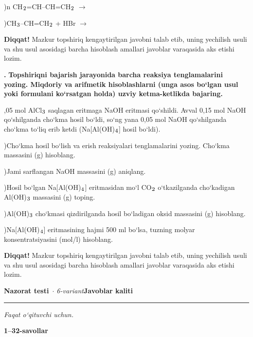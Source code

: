 \documentclass[11pt,a4paper]{article}
\renewcommand{\textsubscript}[1]{\ensuremath{_{\text{\fontsize{8}{8}\selectfont #1}}}}
\newcommand{\qn}[1]{\textbf{\fontsize{11.5}{13}\selectfont #1}}
\newcommand{\qsep}{\par\vspace{1pt}\noindent\rule{0pt}{0.4pt}\par\vspace{5pt}}
\newcommand{\diqqat}[1]{\par\smallskip\noindent\textbf{Diqqat!} #1\par\medskip}
\begin{document}
)n CH\textsubscript{2}=CH--CH=CH\textsubscript{2} $\to$\par
{})CH\textsubscript{3}--CH=CH\textsubscript{2} + HBr $\to$\par
\diqqat{Mazkur topshiriq kengaytirilgan javobni talab etib, uning yechilish usuli va shu usul asosidagi barcha hisoblash amallari javoblar varaqasida aks etishi lozim.}\qsep
\noindent\qn{43.} \textbf{Topshiriqni bajarish jarayonida barcha reaksiya tenglamalarini yozing. Miqdoriy va arifmetik hisoblashlarni (unga asos bo`lgan usul yoki formulani ko`rsatgan holda) uzviy ketma-ketlikda bajaring.}\par{},05 mol AlCl\textsubscript{3} saqlagan eritmaga NaOH eritmasi qo`shildi. Avval 0,15 mol NaOH qo`shilganda cho`kma hosil bo`ldi, so`ng yana 0,05 mol NaOH qo`shilganda cho`kma to`liq erib ketdi (Na[Al(OH)\textsubscript{4}] hosil bo`ldi).\par
{})Cho`kma hosil bo`lish va erish reaksiyalari tenglamalarini yozing. Cho`kma massasini (g) hisoblang.\par
{})Jami sarflangan NaOH massasini (g) aniqlang.\par
{})Hosil bo`lgan Na[Al(OH)\textsubscript{4}] eritmasidan mo`l CO\textsubscript{2} o`tkazilganda cho`kadigan Al(OH)\textsubscript{3} massasini (g) toping.\par
{})Al(OH)\textsubscript{3} cho`kmasi qizdirilganda hosil bo`ladigan oksid massasini (g) hisoblang.\par
{})Na[Al(OH)\textsubscript{4}] eritmasining hajmi 500 ml bo`lsa, tuzning molyar konsentratsiyasini (mol/l) hisoblang.\par
\diqqat{Mazkur topshiriq kengaytirilgan javobni talab etib, uning yechilish usuli va shu usul asosidagi barcha hisoblash amallari javoblar varaqasida aks etishi lozim.}\qsep
\newpage
\noindent\textbf{\fontsize{13}{15}\selectfont Nazorat testi}\ \textit{$\cdot$ 6-variant}\hfill \textbf{Javoblar kaliti}\par\smallskip\hrule\smallskip
\textit{Faqat o`qituvchi uchun.}\par\medskip
\noindent\textbf{1--32-savollar}\par\smallskip
\end{document}
